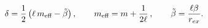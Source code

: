 \begin{equation}
\delta =\frac{1}{2}\left(\ell\,m_{\mbox{\scriptsize{eff}}}-
\tilde{\beta}\right),\,\,\,\,\,\,\,\,\,\,\,\,m_{\mbox{\scriptsize{eff}}}=
m + \frac{1}{2\ell}\,
,\,\,\,\,\,\,\,\,\,\,\,\,\tilde{\beta}=\frac{\ell \beta}{r_{ex}}.
\end{equation}


